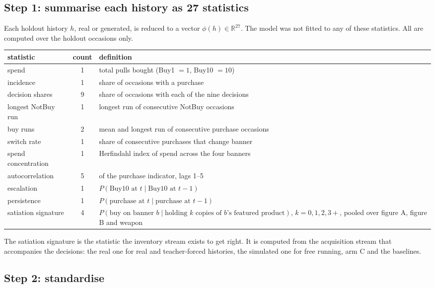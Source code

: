 \documentclass[11pt]{article}
\begin{document}
\subsection{Step 1: summarise each history as 27 statistics}

Each holdout history $h$, real or generated, is reduced to a vector
$\phi(h) \in \mathbb{R}^{27}$. The model was not fitted to any of these
statistics. All are computed over the holdout occasions only.

\begin{center}
\small
\begin{tabularx}{\linewidth}{@{}l c X@{}}
\toprule
statistic & count & definition \\
\midrule
spend & 1 & total pulls bought (Buy1 $=1$, Buy10 $=10$) \\
incidence & 1 & share of occasions with a purchase \\
decision shares & 9 & share of occasions with each of the nine decisions \\
longest NotBuy run & 1 & longest run of consecutive NotBuy occasions \\
buy runs & 2 & mean and longest run of consecutive purchase occasions \\
switch rate & 1 & share of consecutive purchases that change banner \\
spend concentration & 1 & Herfindahl index of spend across the four banners \\
autocorrelation & 5 & of the purchase indicator, lags 1--5 \\
escalation & 1 & $P(\text{Buy10 at } t \mid \text{Buy10 at } t-1)$ \\
persistence & 1 & $P(\text{purchase at } t \mid \text{purchase at } t-1)$ \\
satiation signature & 4 & $P(\text{buy on banner } b \mid \text{holding } k
  \text{ copies of } b\text{'s featured product})$, $k = 0,1,2,3{+}$, pooled over
  figure A, figure B and weapon \\
\bottomrule
\end{tabularx}
\end{center}

\noindent The satiation signature is the statistic the inventory stream exists
to get right. It is computed from the acquisition stream that accompanies the
decisions: the real one for real and teacher-forced histories, the simulated
one for free running, arm C and the baselines.

\subsection{Step 2: standardise}
\end{document}
